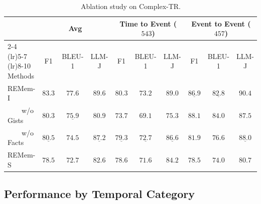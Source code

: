 \documentclass{article} %
\newcommand{\ours}{REMem\xspace}
\begin{document}
\begin{table}[tbh]
\centering
\small
\caption{Ablation study on Complex-TR.}
\vspace{0.2em}
\label{tab:complex-tr-ablation}
\begin{tabular}{l|ccc|ccc|ccc}
\toprule
 & \multicolumn{3}{c|}{Avg} & \multicolumn{3}{c|}{Time to Event ($543$)} & \multicolumn{3}{c}{Event to Event ($457$)} \\
\cmidrule(lr){2-4} \cmidrule(lr){5-7} \cmidrule(lr){8-10}
Methods & F1 & BLEU-1 & LLM-J & F1 & BLEU-1 & LLM-J & F1 & BLEU-1 & LLM-J \\
\midrule
\ours-I & $\mathbf{83.3}$ & $\mathbf{77.6}$ & $\mathbf{89.6}$ & $\mathbf{80.3}$ & $\mathbf{73.2}$ & $\mathbf{89.0}$ & $\underline{86.9}$ & $\underline{82.8}$ & $\mathbf{90.4}$ \\
\ \ \ \ w/o Gists & $80.3$ & $\underline{75.9}$ & $80.9$ & $73.7$ & $69.1$ & $75.3$ & $\mathbf{88.1}$ & $\mathbf{84.0}$ &  $87.5$ \\
\ \ \ \ w/o Facts &  $\underline{80.5}$ & $74.5$ & $\underline{87.2}$ & $\underline{79.3}$ & $\underline{72.7}$ & $\underline{86.6}$ & $81.9$ & $76.6$ & $\underline{88.0}$  \\  
\ours-S & $78.5$ & $72.7$ & $82.6$ & $78.6$ & $71.6$ & $84.2$ & $78.5$ & $74.0$ & $80.7$ \\
\bottomrule
\end{tabular}
\end{table}


\subsection{Performance by Temporal Category}
\end{document}
